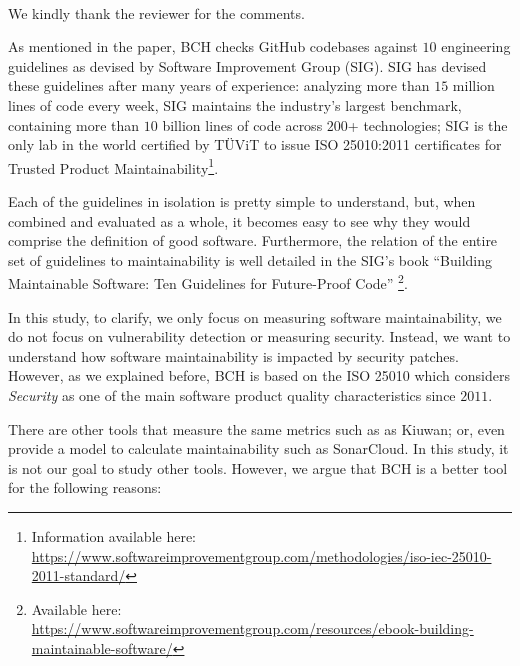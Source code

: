 \documentclass[11pt,fleqn]{article}
\newcommand{\eline}{\vspace*{.75\baselineskip}}
\newcommand{\Us}{\eline \noindent {\bf Response:}\\}
\begin{document}
\Us We kindly thank the reviewer for the comments. 

As mentioned in the paper, BCH checks GitHub codebases against $10$ engineering 
guidelines as devised by Software Improvement Group (SIG). SIG has devised 
these guidelines after many years of experience: analyzing more than $15$ million 
lines of code every week, SIG maintains the industry’s largest 
benchmark, containing more than $10$ billion lines of code across $200$+ 
technologies; SIG is the only lab in the world certified by TÜViT to issue ISO 25010:2011
certificates for Trusted Product Maintainability\footnote{Information available here: 
\url{https://www.softwareimprovementgroup.com/methodologies/iso-iec-25010-2011-standard/}}.

Each of the guidelines in isolation is pretty simple to understand, but, when 
combined and evaluated as a whole, it becomes easy to see why 
they would comprise the definition of good software. Furthermore, the relation of the entire set of
guidelines to maintainability is well detailed in the SIG's book ``Building Maintainable 
Software: Ten Guidelines for Future-Proof Code''
\footnote{Available here: 
\url{https://www.softwareimprovementgroup.com/resources/ebook-building-maintainable-software/}}.

In this study, to clarify, we only focus on measuring software maintainability, we do not focus 
on vulnerability detection or measuring security. Instead, we want to understand how software 
maintainability is impacted by security patches. However, as we explained before, BCH is 
based on the ISO 25010 which considers \emph{Security} as one of the main software product quality 
characteristics since $2011$.

There are other tools that measure the same metrics such as as Kiuwan; or, even 
provide a model to calculate maintainability such as SonarCloud. In this study, it is not
our goal to study other tools. However, we argue
that BCH is a better tool for the following reasons:
\end{document}
